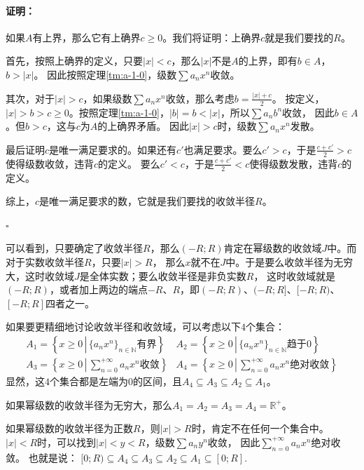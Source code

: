 \documentclass[12pt,UTF8]{ctexbook}
\theoremstyle{definition}
\theoremstyle{plain}
\renewenvironment{proof}{\paragraph{\textbf{证明：}}}{\hfill$\square$}
\begin{document}
\begin{appendix}
\begin{proof}
    如果$A$有上界，那么它有上确界$c\geqslant 0$。我们将证明：上确界$c$就是我们要找的$R$。
    
    首先，按照上确界的定义，只要$|x|<c$，那么$|x|$不是$A$的上界，即有$b\in A$，$b>|x|$。
    因此按照定理\ref{tm:a-1-0}，级数$\sum a_n x^n$收敛。

    其次，对于$|x|>c$，如果级数$\sum a_n x^n$收敛，那么考虑$b = \frac{|x| + c}{2}$。
    按定义，$|x| > b > c \geqslant 0$。按照定理\ref{tm:a-1-0}，$|b| = b < |x|$，所以$\sum a_n b^n$收敛，
    因此$b \in A$。但$b>c$，这与$c$为$A$的上确界矛盾。
    因此$|x|>c$时，级数$\sum a_n x^n$发散。

    最后证明$c$是唯一满足要求的。如果还有$c'$也满足要求。要么$c'>c$，于是$\frac{c+c'}{2} > c$使得级数收敛，违背$c$的定义。
    要么$c'<c$，于是$\frac{c+c'}{2} < c$使得级数发散，违背$c$的定义。

    综上，$c$是唯一满足要求的数，它就是我们要找的收敛半径$R$。

\end{proof}

可以看到，只要确定了收敛半径$R$，那么$(-R;R)$肯定在幂级数的收敛域$J$中。而对于实数收敛半径$R$，只要$|x|>R$，
那么$x$就不在$J$中。于是要么收敛半径为无穷大，这时收敛域$J$是全体实数；要么收敛半径是非负实数$R$，
这时收敛域就是$(-R;R)$，或者加上两边的端点$-R$、$R$，即$(-R;R)$、$(-R;R]$、$[-R;R)$、$[-R;R]$四者之一。

如果要更精细地讨论收敛半径和收敛域，可以考虑以下$4$个集合：
\begin{align*}
    A_1 = \left\{ x \geqslant 0 \, \left| \, \{a_n x^n\}_{n\in\mathbb{N}}\mbox{有界} \right. \right\} & A_2 = \left\{ x \geqslant 0 \, \left| \, \{a_n x^n\}_{n\in\mathbb{N}}\mbox{趋于}0 \right. \right\} \\[4pt]
    A_3 = \left\{ x \geqslant 0 \, \left| \, \sum_{n=0}^{+\infty} a_n x^n \mbox{收敛} \right. \right\} & A_4 =  \left\{ x \geqslant 0 \, \left| \, \sum_{n=0}^{+\infty} a_n x^n \mbox{绝对收敛} \right. \right\}
\end{align*}
显然，这$4$个集合都是左端为$0$的区间，且$A_4\subseteq A_3 \subseteq A_2\subseteq A_1$。

如果幂级数的收敛半径为无穷大，那么$A_1 = A_2 = A_3 = A_4 = \mathbb{R}^+$。

如果幂级数的收敛半径为正数$R$，则$|x|>R$时，肯定不在任何一个集合中。$|x|<R$时，可以找到$|x|<y<R$，级数$\sum a_n y^n$收敛，
因此$\sum_{n=0}^{+\infty} a_n x^n$绝对收敛。
也就是说：
$[0;R) \subseteq A_4\subseteq A_3 \subseteq A_2\subseteq A_1 \subseteq [0;R].$


\end{appendix}
\end{document}
